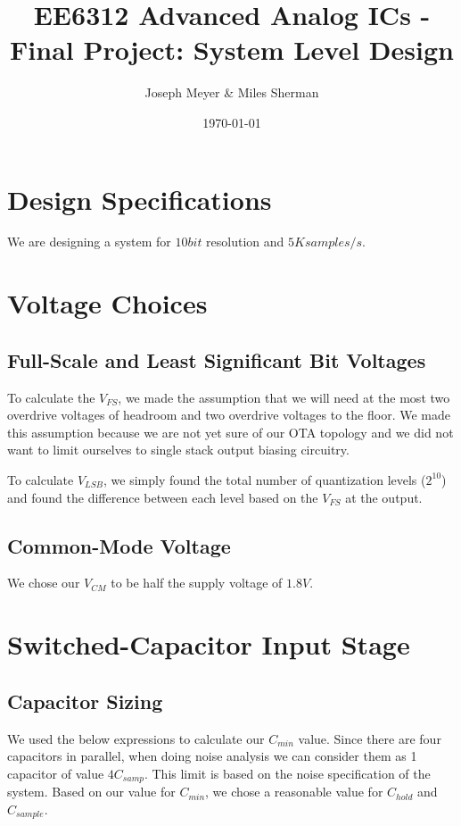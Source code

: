 \documentclass{article}
\begin{document}
\title{EE6312 Advanced Analog ICs - Final Project: System Level Design}
\author{Joseph Meyer \& Miles Sherman}
\date{\today}
\maketitle

\section{Design Specifications}
We are designing a system for $10 bit$ resolution and $5K samples/s$.

\section{Voltage Choices}
\subsection{Full-Scale and Least Significant Bit Voltages}
To calculate the $V_{FS}$, we made the assumption that we will need at the most two overdrive voltages of headroom and two overdrive voltages to the floor. We made this assumption because we are not yet sure of our OTA topology and we did not want to limit ourselves to single stack output biasing circuitry. 

To calculate $V_{LSB}$, we simply found the total number of quantization levels ($2^{10}$) and found the difference between each level based on the $V_{FS}$ at the output.

\subsection{Common-Mode Voltage}
We chose our $V_{CM}$ to be half the supply voltage of $1.8V$.

\section{Switched-Capacitor Input Stage}
\subsection{Capacitor Sizing}
We used the below expressions to calculate our $C_{min}$ value. Since there are four capacitors in parallel, when doing noise analysis we can consider them as 1 capacitor of value $4C_{samp}$. This limit is based on the noise specification of the system. Based on our value for $C_{min}$, we chose a reasonable value for $C_{hold}$ and $C_{sample}$.
\end{document}
